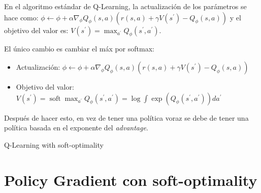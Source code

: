 En el algoritmo estándar de Q-Learning, la actualización de los parámetros se hace como: $ \phi
\leftarrow \phi + \alpha \nabla _ { \phi } Q _ { \phi } ( s , a ) ( r ( s , a ) + \gamma V ( s ^
{ \prime } ) - Q _ { \phi } ( s , a ) ) $ y el objetivo del valor es: $ V ( s ^ { \prime } ) =
\operatorname { max } _ { a ^ { \prime } } Q _ { \phi } ( s ^ { \prime } , a ^ { \prime } ) $.

El único cambio es cambiar el máx por softmax:
\begin{itemize}
    \item Actualización: $ \phi \leftarrow \phi + \alpha \nabla _ { \phi } Q _ { \phi } ( s , a ) ( r ( s , a ) + \gamma V ( s ^ { \prime } ) - Q _ { \phi } ( s , a ) ) $
    \item Objetivo del valor: $ V ( s ^ { \prime } ) = \operatorname { soft } \operatorname { max } _ { a ^ { \prime } } Q _ { \phi } ( s ^ { \prime } , a ^ { \prime } ) = \operatorname { log } \int \operatorname { exp } ( Q _ { \phi } ( s ^ { \prime } , a ^ { \prime } ) ) d a ^ { \prime } $
\end{itemize}
Después de hacer esto, en vez de tener una política voraz se debe de tener una política basada
en el exponente del \textit{advantage}.

\begin{algorithm}
    \caption{Q-Learning with soft-optimality}
\end{algorithm}

\section{Policy Gradient con soft-optimality}%
\label{sec:policy_gradient_con_soft_optimality}

